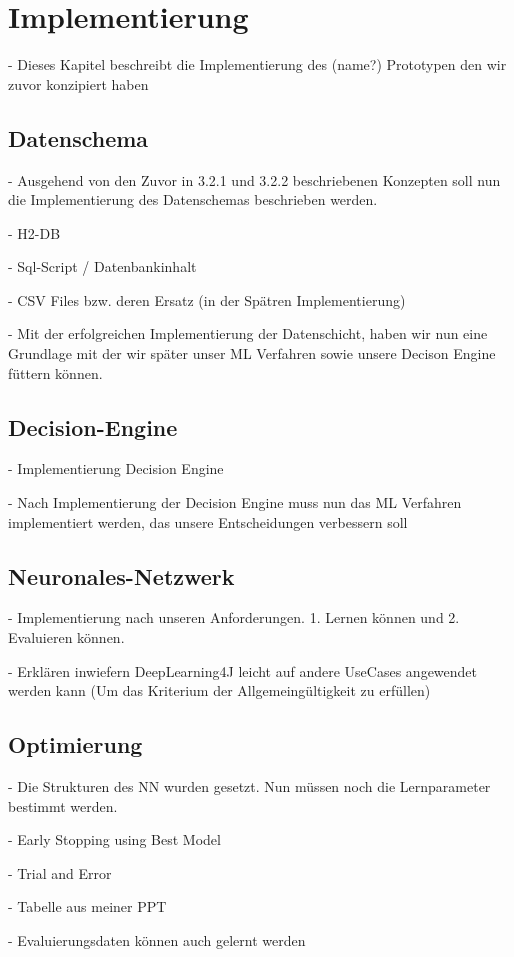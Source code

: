 \chapter{Implementierung}
- Dieses Kapitel beschreibt die Implementierung des (name?) Prototypen den wir zuvor konzipiert haben

\section{Datenschema}
- Ausgehend von den Zuvor in 3.2.1 und 3.2.2 beschriebenen Konzepten soll nun die Implementierung des Datenschemas beschrieben werden.

- H2-DB

- Sql-Script / Datenbankinhalt

- CSV Files bzw. deren Ersatz (in der Spätren Implementierung)

- Mit der erfolgreichen Implementierung der Datenschicht, haben wir nun eine Grundlage mit der wir später unser ML Verfahren sowie unsere Decison Engine füttern können.

\section{Decision-Engine}
- Implementierung Decision Engine 

- Nach Implementierung der Decision Engine muss nun das ML Verfahren implementiert werden, das unsere Entscheidungen verbessern soll

\section{Neuronales-Netzwerk}
- Implementierung nach unseren Anforderungen. 1. Lernen können und 2. Evaluieren können.  

- Erklären inwiefern DeepLearning4J leicht auf andere UseCases angewendet werden kann (Um das Kriterium der Allgemeingültigkeit zu erfüllen)

\section{Optimierung}
- Die Strukturen des NN wurden gesetzt. Nun müssen noch die Lernparameter bestimmt werden.

- Early Stopping using Best Model 

- Trial and Error

- Tabelle aus meiner PPT

- Evaluierungsdaten können auch gelernt werden 